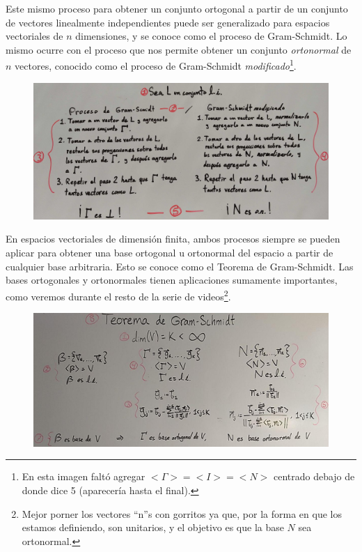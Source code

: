 \documentclass[12pt,dvipsnames]{article}
\numberwithin{equation}{section}
\begin{document}
Este mismo proceso para obtener un conjunto ortogonal a partir de un conjunto de vectores linealmente independientes puede ser generalizado para espacios vectoriales de $n$ dimensiones, y se conoce como el proceso de Gram-Schmidt. Lo mismo ocurre con el proceso que nos permite obtener un conjunto \emph{ortonormal} de $n$ vectores, conocido como el proceso de Gram-Schmidt \emph{modificado}\footnote{En esta imagen faltó agregar $<\Gamma>=<I>=<N>$ centrado debajo de donde dice 5 (aparecería hasta el final).}.

\begin{figure}[h!]
    \centering
    \includegraphics[width=17cm]{Ortogonalizacion_y_ortonormalizacion-1.png}
\end{figure}

En espacios vectoriales de dimensión finita, ambos procesos siempre se pueden aplicar para obtener una base ortogonal u ortonormal del espacio a partir de cualquier base arbitraria. Esto se conoce como el Teorema de Gram-Schmidt. Las bases ortogonales y ortonormales tienen aplicaciones sumamente importantes, como veremos durante el resto de la serie de videos\footnote{Mejor porner los vectores ``n''s con gorritos ya que, por la forma en que los estamos definiendo, son unitarios, y el objetivo es que la base $N$ sea ortonormal.}.

\begin{figure}[h!]
    \centering
    \includegraphics[width=17cm]{Ortogonalizacion_y_ortonormalizacion-2.png}
\end{figure}
\end{document}
